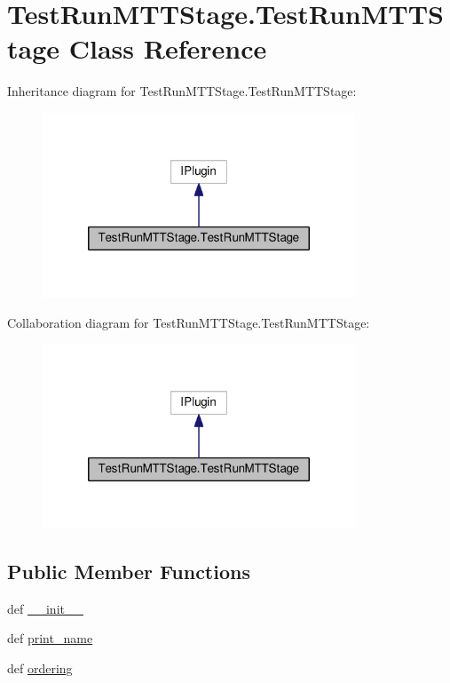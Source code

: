 \hypertarget{class_test_run_m_t_t_stage_1_1_test_run_m_t_t_stage}{\section{Test\-Run\-M\-T\-T\-Stage.\-Test\-Run\-M\-T\-T\-Stage Class Reference}
\label{class_test_run_m_t_t_stage_1_1_test_run_m_t_t_stage}
}


Inheritance diagram for Test\-Run\-M\-T\-T\-Stage.\-Test\-Run\-M\-T\-T\-Stage\-:
\nopagebreak
\begin{figure}[H]
\begin{center}
\leavevmode
\includegraphics[width=264pt]{class_test_run_m_t_t_stage_1_1_test_run_m_t_t_stage__inherit__graph}
\end{center}
\end{figure}


Collaboration diagram for Test\-Run\-M\-T\-T\-Stage.\-Test\-Run\-M\-T\-T\-Stage\-:
\nopagebreak
\begin{figure}[H]
\begin{center}
\leavevmode
\includegraphics[width=264pt]{class_test_run_m_t_t_stage_1_1_test_run_m_t_t_stage__coll__graph}
\end{center}
\end{figure}
\subsection*{Public Member Functions}
\begin{DoxyCompactItemize}
\item 
def \hyperlink{class_test_run_m_t_t_stage_1_1_test_run_m_t_t_stage_a832d01c482e3593c6ca5a70a8c50401b}{\-\_\-\-\_\-init\-\_\-\-\_\-}
\item 
def \hyperlink{class_test_run_m_t_t_stage_1_1_test_run_m_t_t_stage_ae33f5d11e9f6d745e5a4b8b527581787}{print\-\_\-name}
\item 
def \hyperlink{class_test_run_m_t_t_stage_1_1_test_run_m_t_t_stage_ab22af0d8f9b65095162240a35a072068}{ordering}
\end{DoxyCompactItemize}


